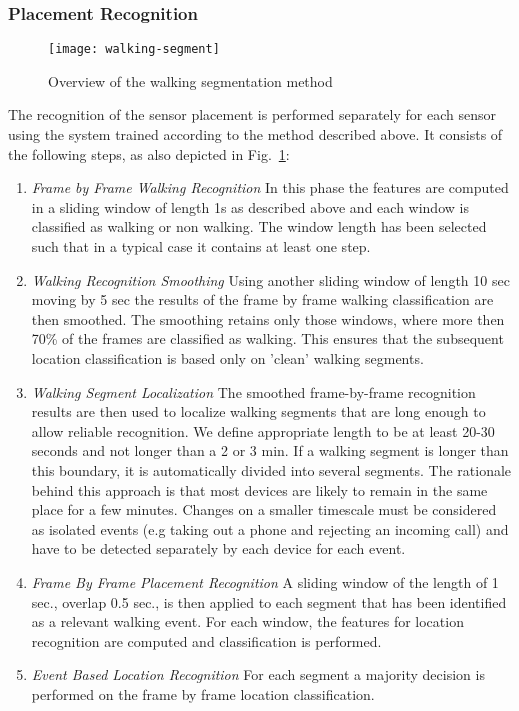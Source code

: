 \subsubsection{Placement Recognition}
\label{rec}

\begin{figure}[!t]
\centering
\texttt{[image: walking-segment]}
\caption{Overview of the walking segmentation method}  
\label{fig:walking-segment} 
\end{figure}
The recognition of the sensor placement is performed separately for each sensor using the
system trained according to the method described above. It consists of
the following steps, as also depicted in
Fig.~\ref{fig:walking-segment}:
\begin{enumerate}
\item{\em Frame by Frame Walking Recognition}
In this phase the features are computed in a sliding  window of length
1s as described above and each window is classified as walking or non
walking. The window length has been selected such that in a typical case
it contains at least one step.
\item{\em Walking Recognition Smoothing} Using another sliding window
  of length 10 sec moving by 5 sec the results of the frame by frame
  walking classification are then smoothed. The smoothing retains only
  those windows, where more then 70\% of the frames are classified as
  walking. This ensures that the subsequent location classification is
  based only on 'clean' walking segments.
\item{\em Walking Segment Localization} The smoothed frame-by-frame
  recognition results are then used to localize walking segments that
  are long enough to allow reliable recognition. We define appropriate
  length to be at least 20-30 seconds and not longer than a 2 or 3
  min. If a walking segment is longer than this boundary, it is
  automatically divided into several segments. The rationale behind
  this approach is that most devices are likely to remain in the same
  place for a few minutes. Changes on a smaller timescale must be
  considered as isolated events (e.g taking out a phone and rejecting
  an incoming call) and have to be detected separately by each device
  for each event.
\item{\em Frame By Frame Placement Recognition} A sliding window of the
  length of 1 sec., overlap 0.5 sec., is then applied to each segment
  that has been identified as a relevant walking event. For each
  window, the features for location recognition are computed and
  classification is performed.
\item{\em Event Based Location Recognition}
For each segment a majority decision is performed on the frame by
frame location classification.
\end{enumerate}

